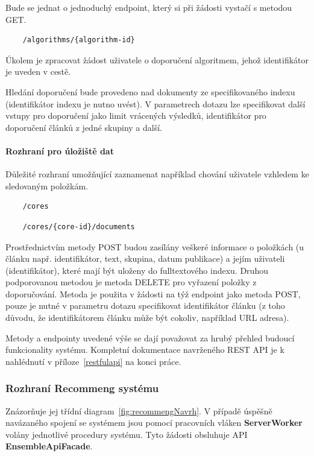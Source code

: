 \documentclass[thesis=M,czech]{FITthesis}[2014/05/07]
\begin{document}
Bude se jednat o jednoduchý endpoint, který si při žádosti vystačí s metodou GET.

\begin{verbatim}
	/algorithms/{algorithm-id}
\end{verbatim}

Úkolem je zpracovat žádost uživatele o doporučení algoritmem, jehož identifikátor je uveden v cestě. 

Hledání doporučení bude provedeno nad dokumenty ze specifikovaného indexu (identifikátor indexu je nutno uvést). V parametrech dotazu lze specifikovat další vstupy pro doporučení jako limit vrácených výsledků, identifikátor pro doporučení článků z jedné skupiny a další.

\paragraph{Rozhraní pro úložiště dat}

Důležité rozhraní umožňující zaznamenat například chování uživatele vzhledem ke sledovaným položkám.

\begin{verbatim}
	/cores
\end{verbatim}

\begin{verbatim}
	/cores/{core-id}/documents
\end{verbatim}

Prostřednictvím metody POST budou zasílány veškeré informace o položkách (u článku např. identifikátor, text, skupina, datum publikace) a jejím uživateli (identifikátor), které mají být uloženy do fulltextového indexu. Druhou podporovanou metodou je metoda DELETE pro vyřazení položky z doporučování. Metoda je použita v žádosti na týž endpoint jako metoda POST, pouze je nutné v parametru dotazu specifikovat identifikátor článku (z toho důvodu, že identifikátorem článku může být cokoliv, například URL adresa).

Metody a endpointy uvedené výše se dají považovat za hrubý přehled budoucí funkcionality systému. Kompletní dokumentace navrženého REST API je k nahlédnutí v příloze~\ref{restfulapi} na konci práce.

\subsubsection{Rozhraní Recommeng systému}
Znázorňuje jej třídní diagram~\ref{fig:recommengNavrh}. V případě úspěšně navázaného spojení se systémem jsou pomocí pracovních vláken \textbf{ServerWorker} volány jednotlivé procedury systému. Tyto žádosti obsluhuje API \textbf{EnsembleApiFacade}.
\end{document}
